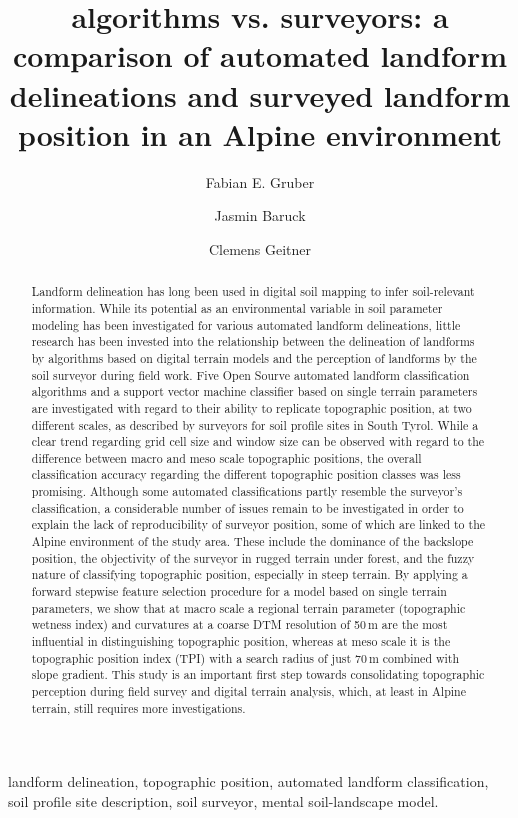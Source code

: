 \documentclass[preprint,12pt,authoryear]{elsarticle}
\begin{document}
\begin{frontmatter}

\title{algorithms vs. surveyors: a comparison of automated landform delineations and surveyed landform position in an Alpine environment}


\author{Fabian E. Gruber}
\author{Jasmin Baruck}
\author{Clemens Geitner}

\address{University of Innsbruck}

\begin{abstract}
Landform delineation has long been used in digital soil mapping to infer soil-relevant information. While its potential as an environmental variable in soil parameter modeling has been investigated for various automated landform delineations, little research has been invested into the relationship between the delineation of landforms by algorithms based on digital terrain models and the perception of landforms by the soil surveyor during field work. Five Open Sourve automated landform classification algorithms and a support vector machine classifier based on single terrain parameters are investigated  with regard to their ability to replicate topographic position, at two different scales, as described by surveyors for soil profile sites in South Tyrol. While a clear trend regarding grid cell size and window size can be observed with regard to the difference between macro and meso scale topographic positions, the overall classification accuracy regarding the different topographic position classes was less promising. Although some automated classifications partly resemble the surveyor's classification, a considerable number of issues remain to be investigated in order to explain the lack of reproducibility of surveyor position, some of which are linked to the Alpine environment of the study area. These include the dominance of the backslope position, the objectivity of the surveyor in rugged terrain under forest, and the fuzzy nature of classifying topographic position, especially in steep terrain. By applying a forward stepwise feature selection procedure for a model based on single terrain parameters, we show that at macro scale a regional terrain parameter (topographic wetness index) and curvatures at a coarse DTM resolution of 50\,m are the most influential in distinguishing topographic position, whereas at meso scale it is the topographic position index (TPI) with a search radius of just 70\,m combined with slope gradient. This study is an important first step towards consolidating topographic perception during field survey and digital terrain analysis, which, at least in Alpine terrain, still requires more investigations.
 
\end{abstract}

\begin{keyword}
landform delineation, topographic position, automated landform classification, soil profile site description, soil surveyor, mental soil-landscape model.
\end{keyword}

\end{frontmatter}
\end{document}
